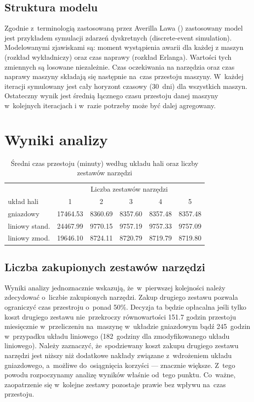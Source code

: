 \documentclass[12pt, a4paper, oneside]{mwart} %
\begin{document}
\subsection{Struktura modelu}
Zgodnie z~terminologią zastosowaną przez Averilla Lawa (\cite{law}) zastosowany model jest przykładem symulacji zdarzeń dyskretnych (discrete-event simulation). Modelowanymi zjawiskami są: moment wystąpienia awarii dla każdej z maszyn (rozkład wykładniczy) oraz czas naprawy (rozkład Erlanga). Wartości tych zmiennych są losowane niezależnie. Czas oczekiwania na narzędzia oraz czas naprawy maszyny składają się następnie na~czas przestoju maszyny. W~każdej iteracji symulowany jest cały horyzont czasowy (30~dni) dla wszystkich maszyn. Ostateczny wynik jest średnią łącznego czasu przestoju danej maszyny w~kolejnych iteracjach i w~razie potrzeby może być dalej agregowany.

\section{Wyniki analizy}

\begin{table}[ht]
\centering
\label{sr_czas_przestoju}
\caption{Średni czas przestoju (minuty) według układu hali oraz liczby zestawów narzędzi}
\begin{tabular}{l|c|c|c|c|c}
& \multicolumn{5}{|c}{Liczba zestawów narzędzi}\\
układ hali &        1 &       2 &       3 &       4 &       5 \\ \hline
gniazdowy  & 17464.53 & 8360.69 & 8357.60 & 8357.48 & 8357.48 \\
liniowy stand. & 24467.99 & 9770.15 & 9757.19 & 9757.33 & 9757.09 \\
liniowy zmod. & 19646.10 & 8724.11 & 8720.79 & 8719.79 & 8719.80 \\
\end{tabular}
\end{table}

\subsection{Liczba zakupionych zestawów narzędzi}
Wyniki analizy jednoznacznie wskazują, że~w~pierwszej kolejności należy zdecydować o~liczbie zakupionych narzędzi. Zakup drugiego zestawu pozwala ograniczyć czas przestroju o~ponad 50\%. Decyzja ta będzie opłacalna jeśli tylko koszt drugiego zestawu nie~przekroczy równowartości 151.7 godzin przestoju miesięcznie w~przeliczeniu na~maszynę w~układzie gniazdowym bądź 245~godzin w~przypadku układu liniowego (182~godziny dla zmodyfikowanego układu liniowego). Należy zaznaczyć, że~spodziewany koszt zakupu drugiego zestawu narzędzi jest niższy niż dodatkowe nakłady związane z~wdrożeniem układu gniazdowego, a~możliwe do~osiągnięcia korzyści --- znacznie większe. Z~tego powodu rozpoczynamy analizę wyników właśnie od~tego punktu. Co~ważne, zaopatrzenie się w~kolejne zestawy pozostaje prawie bez wpływu na~czas przestoju.
\end{document}
